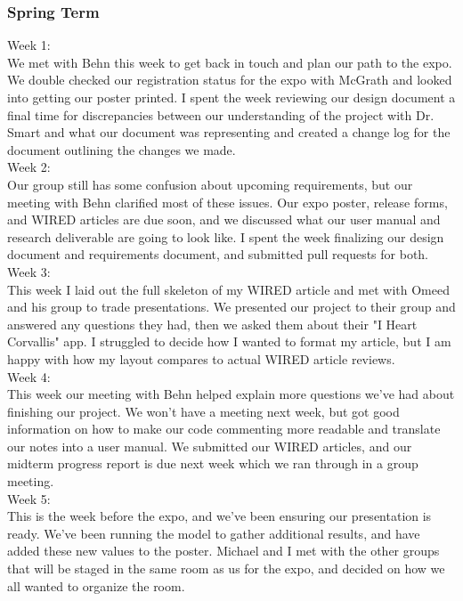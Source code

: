 \documentclass[draftclsnofoot, onecolumn, 10pt, compsoc]{IEEEtran}
\begin{document}
  	\subsubsection{Spring Term}
    	Week 1: \\ \indent We met with Behn this week to get back in touch and plan our path to the expo. We double checked our registration status for the expo with McGrath and looked into getting our poster printed. I spent the week reviewing our design document a final time for discrepancies between our understanding of the project with Dr. Smart and what our document was representing and created a change log for the document outlining the changes we made. \\
    	Week 2: \\ \indent Our group still has some confusion about upcoming requirements, but our meeting with Behn clarified most of these issues. Our expo poster, release forms, and WIRED articles are due soon, and we discussed what our user manual and research deliverable are going to look like. I spent the week finalizing our design document and requirements document, and submitted pull requests for both. \\
    	Week 3: \\ \indent This week I laid out the full skeleton of my WIRED article and met with Omeed and his group to trade presentations. We presented our project to their group and answered any questions they had, then we asked them about their "I Heart Corvallis" app. I struggled to decide how I wanted to format my article, but I am happy with how my layout compares to actual WIRED article reviews. \\
    	Week 4: \\ \indent This week our meeting with Behn helped explain more questions we've had about finishing our project.  We won't have a meeting next week, but got good information on how to make our code commenting more readable and translate our notes into a user manual. We submitted our WIRED articles, and our midterm progress report is due next week which we ran through in a group meeting. \\
    	Week 5: \\ \indent This is the week before the expo, and we've been ensuring our presentation is ready. We've been running the model to gather additional results, and have added these new values to the poster. Michael and I met with the other groups that will be staged in the same room as us for the expo, and decided on how we all wanted to organize the room. \\
\end{document}
